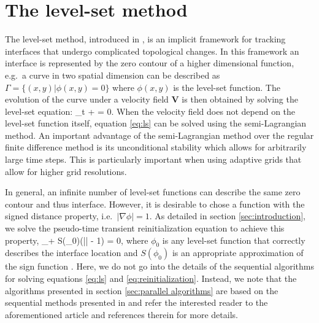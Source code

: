 \section{The level-set method}\label{sec:levelset method}
The level-set method, introduced in \cite{Osher;Sethian:88:Fronts-Propagating-w}, is an implicit framework for tracking interfaces that undergo complicated topological changes. In this framework an interface is represented by the zero contour of a higher dimensional function, e.g.\ a curve in two spatial dimension can be described as $\Gamma = \{(x,y) | \phi(x,y) = 0\}$ where $\phi(x,y)$ is the level-set function. The evolution of the curve under a velocity field $\mathbf{V}$ is then obtained by solving the level-set equation:
\be
\phi_t +  \cdot \nabla \phi = 0.
\label{eq:ls}
\ee
When the velocity field does not depend on the level-set function itself, equation \eqref{eq:ls} can be solved using the semi-Lagrangian method. An important advantage of the semi-Lagrangian method over the regular finite difference method is its unconditional stability which allows for arbitrarily large time steps. This is particularly important when using adaptive grids that allow for higher grid resolutions.

In general, an infinite number of level-set functions can describe the same zero contour and thus interface. However, it is desirable to chose a function with the signed distance property, i.e.\ $|\nabla \phi| = 1$. As detailed in section \ref{sec:introduction}, we solve the pseudo-time transient reinitialization equation \cite{Sussman;Smereka;Osher:94:A-Level-Set-Approach, Osher;Fedkiw:01:Level-Set-Methods:-A} to achieve this property,
\be
\phi_\tau + S(\phi_0)\left(|\nabla \phi| - 1\right) = 0,
\label{eq:reinitialization}
\ee
where $\phi_0$ is any level-set function that correctly describes the interface location and $S(\phi_0)$ is an appropriate approximation of the sign function \cite{Osher;Fedkiw:02:Level-Set-Methods-an}. Here, we do not go into the details of the sequential algorithms for solving equations \eqref{eq:ls} and \eqref{eq:reinitialization}. Instead, we note that the algorithms presented in section \ref{sec:parallel algorithms} are based on the sequential methods presented in \cite{Min;Gibou:07:A-second-order-accur} and refer the interested reader to the aforementioned article and references therein for more details.


